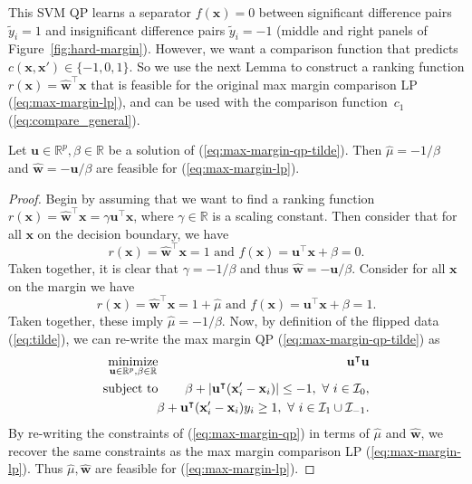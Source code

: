 \documentclass[twoside,11pt]{article}
\newcommand{\RR}{\mathbb R}
\DeclareMathOperator*{\minimize}{minimize}
\begin{document}
This SVM QP learns a separator $f(\mathbf x)=0$ between significant
difference pairs $\tilde y_i=1$ and insignificant difference pairs
$\tilde y_i=-1$ (middle and right panels of
Figure~\ref{fig:hard-margin}). However, we want a comparison function
that predicts $c(\mathbf x,\mathbf x')\in\{-1,0,1\}$. So we use the
next Lemma to construct a ranking function $r(\mathbf x)= \mathbf{\hat
  w}^\intercal \mathbf x$ that is feasible for the original max margin
comparison LP (\ref{eq:max-margin-lp}), and can be used with the
comparison function~$c_1$ (\ref{eq:compare_general}).
\begin{lemma}
  Let $\mathbf u\in\RR^p,\beta\in\RR$ be a solution of
  (\ref{eq:max-margin-qp-tilde}). Then $\hat \mu = -1/\beta$ and
  $\mathbf{\hat w} = -\mathbf u/\beta$ are feasible for
  (\ref{eq:max-margin-lp}).
  \label{lemma:feasible}
\end{lemma}
\begin{proof}
  Begin by assuming that we want to find a ranking function $r(\mathbf
  x)=\mathbf{\hat w}^\intercal \mathbf x = \gamma \mathbf u^\intercal
  \mathbf x$, where $\gamma\in\RR$ is a scaling constant. Then
  consider that for all $\mathbf x$ on the decision boundary, we have
  \begin{equation}
    \label{eq:dec-boundary-rank}
    r(\mathbf x) = \mathbf{\hat w}^\intercal \mathbf x = 1\text{ and } 
    f(\mathbf x) = \mathbf u^\intercal \mathbf x + \beta = 0.
  \end{equation}
  Taken together, it is clear that $\gamma=-1/\beta$ and thus
  $\mathbf{\hat w} = -\mathbf u/\beta$. Consider for all $\mathbf x$ on the
  margin we have
  \begin{equation}
    \label{eq:margin-rank}
    r(\mathbf x) = \mathbf{\hat w}^\intercal \mathbf x = 1+\hat\mu\text{ and } 
    f(\mathbf x) = \mathbf u^\intercal \mathbf x + \beta= 1.
  \end{equation}
  Taken together, these imply $\hat \mu=-1/\beta$. Now, by definition
  of the flipped data (\ref{eq:tilde}), we can re-write the max margin
  QP (\ref{eq:max-margin-qp-tilde}) as
\begin{eqnarray}
  \label{eq:max-margin-qp}
    \minimize_{\mathbf u\in\RR^p, \beta\in\RR}\ &&
    \hskip -0.5cm \mathbf u^\intercal \mathbf u  \\
    \text{subject to}\ &&\hskip -0.5cm
    \nonumber \beta + |\mathbf u^\intercal (\mathbf x_i'-\mathbf x_i)| \leq -1,\
    \forall\  i\in \mathcal I_0,\\
    &&\hskip -0.5cm
\nonumber \beta + \mathbf u^\intercal(\mathbf x_i'-\mathbf x_i)y_i \geq 1,
\ \forall\ i \in \mathcal I_1\cup \mathcal I_{-1}.
\end{eqnarray}
By re-writing the constraints of (\ref{eq:max-margin-qp}) in terms of
$\hat \mu$ and $\mathbf{\hat w}$, we recover the same constraints as
the max margin comparison LP (\ref{eq:max-margin-lp}). Thus $\hat \mu,
\mathbf{\hat w}$ are feasible for (\ref{eq:max-margin-lp}).
\end{proof}
\end{document}
